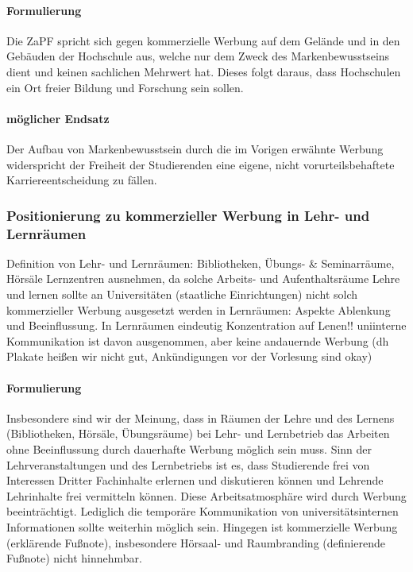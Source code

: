 			\paragraph{Formulierung}
				Die ZaPF spricht sich gegen kommerzielle Werbung auf dem Gelände und in den Gebäuden der Hochschule aus, welche nur dem Zweck des Markenbewusstseins dient und keinen sachlichen Mehrwert hat. Dieses folgt daraus, dass Hochschulen ein Ort freier Bildung und Forschung sein sollen.

 			\paragraph{möglicher Endsatz}
 				Der Aufbau von Markenbewusstsein durch die im Vorigen erwähnte Werbung widerspricht der Freiheit der Studierenden eine eigene, nicht vorurteilsbehaftete Karriereentscheidung zu fällen.

		\subsubsection*{Positionierung zu kommerzieller Werbung in Lehr- und Lernräumen}
			\begin{outline}
				\1 Definition von Lehr- und Lernräumen: Bibliotheken, Übungs- \& Seminarräume, Hörsäle
				\1 Lernzentren ausnehmen, da solche Arbeits- und Aufenthaltsräume
				\1 Lehre und lernen sollte an Universitäten (staatliche Einrichtungen) nicht solch kommerzieller Werbung ausgesetzt werden
				\1 in Lernräumen: Aspekte Ablenkung und Beeinflussung. In Lernräumen eindeutig Konzentration auf Lenen!!
				\1 uniinterne Kommunikation ist davon ausgenommen, aber keine andauernde Werbung (dh Plakate heißen wir nicht gut, Ankündigungen vor der Vorlesung sind okay)
			\end{outline}

			\paragraph{Formulierung}
				Insbesondere sind wir der Meinung, dass in Räumen der Lehre und des Lernens (Bibliotheken, Hörsäle, Übungsräume) bei Lehr- und Lernbetrieb das Arbeiten ohne Beeinflussung durch dauerhafte Werbung möglich sein muss. Sinn der Lehrveranstaltungen und des Lernbetriebs ist es, dass Studierende frei von Interessen Dritter Fachinhalte erlernen und diskutieren können und Lehrende Lehrinhalte frei vermitteln können. Diese Arbeitsatmosphäre wird durch Werbung beeinträchtigt.
				Lediglich die temporäre Kommunikation von universitätsinternen Informationen sollte weiterhin möglich sein.
				Hingegen ist kommerzielle Werbung (erklärende Fußnote), insbesondere Hörsaal- und Raumbranding (definierende Fußnote) nicht hinnehmbar.

